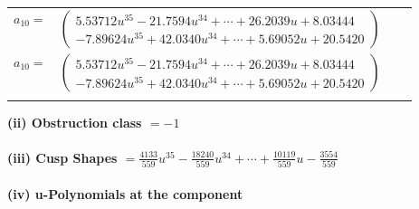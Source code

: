 \documentclass[1p]{elsarticle_modified}
\theoremstyle{definition}
\begin{document}
\begin{tabular}{m{7pt} m{180pt} m{7pt} m{180pt} }
\flushright $a_{10}=$&$\begin{pmatrix}5.53712 u^{35}-21.7594 u^{34}+\cdots+26.2039 u+8.03444\\-7.89624 u^{35}+42.0340 u^{34}+\cdots+5.69052 u+20.5420\end{pmatrix}$\\ \flushright $a_{10}=$&$\begin{pmatrix}5.53712 u^{35}-21.7594 u^{34}+\cdots+26.2039 u+8.03444\\-7.89624 u^{35}+42.0340 u^{34}+\cdots+5.69052 u+20.5420\end{pmatrix}$\\&\end{tabular}
\flushleft \textbf{(ii) Obstruction class $= -1$}\\~\\
\flushleft \textbf{(iii) Cusp Shapes $= \frac{4133}{559} u^{35}-\frac{18240}{559} u^{34}+\cdots+\frac{10119}{559} u-\frac{3554}{559}$}\\~\\
\newpage\renewcommand{\arraystretch}{1}
\flushleft \textbf{(iv) u-Polynomials at the component}\newline \\
\end{document}
